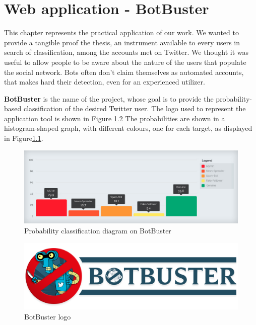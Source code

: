 \chapter{Web application - BotBuster}
\label{capitolo7}
\thispagestyle{empty}
This chapter represents the practical application of our work. We wanted to provide a tangible proof the thesis, an instrument available to every users in search of classification, among the accounts met on Twitter.
We thought it was useful to allow people to be aware about the nature of the users that populate the social network.
Bots often don't claim themselves as automated accounts, that makes hard their detection, even for an experienced utilizer.


\textbf{BotBuster} is the name of the project, whose goal is to provide the probability-based classification of the desired Twitter user.
The logo used to represent the application tool is shown in Figure \ref{fig:botbuster}
The probabilities are shown in a histogram-shaped graph, with different colours, one for each target, as displayed in Figure\ref{fig:histogram}.

\begin{figure}
	\begin{center}
		\includegraphics[width=\columnwidth]{chapter7/figure/histogram.jpg}\par 
	\end{center}
	\caption{Probability classification diagram on BotBuster}
	\label{fig:histogram}
\end{figure}

\begin{figure}
	\begin{center}
		\includegraphics[width=\columnwidth]{chapter7/figure/logo.png}\par 
	\end{center}
	\caption{BotBuster logo}
	\label{fig:botbuster}
\end{figure}

